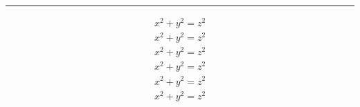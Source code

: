 \documentclass[11pt]{article}
\begin{document}
\allowdisplaybreaks
\begin{mdframed}
  \rule{\linewidth}{0pt}
\begin{align*}
x^2 + y^2 = z^2 \\
x^2 + y^2 = z^2 \\
x^2 + y^2 = z^2 \\
x^2 + y^2 = z^2 \\
x^2 + y^2 = z^2 \\
x^2 + y^2 = z^2
\end{align*}
\end{mdframed}
\end{document}
